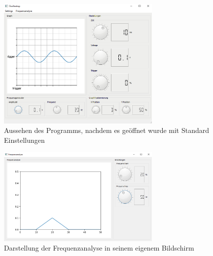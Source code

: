 \documentclass{article}
\begin{document}
\begin{figure}[H]
  \includegraphics[width=300]{"Oszilloskop_Standard_Einstellungen"}
  \caption[\textbf{OszilloskopStandardEinstellungen.PNG},  Quelle: Screenshot eigenes Programm]
  {Aussehen des Programms, nachdem es geöffnet wurde mit Standard Einstellungen}
\end{figure}

\begin{figure}[H]
  \includegraphics[width=300]{"Frequenzanalyse_Darstellung"}
  \caption[\textbf{FrequenzanalyseDarstellung.PNG},  Quelle:  Quelle: Screenshot eigenes Programm]
  {Darstellung der Frequenzanalyse in seinem eigenem Bildschirm}
\end{figure}
\end{document}
